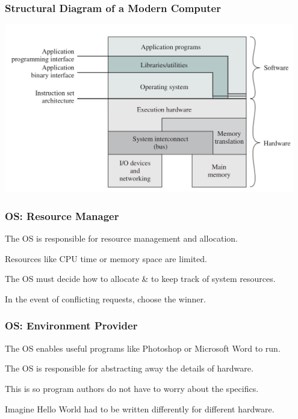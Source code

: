 \begin{frame}
\frametitle{Structural Diagram of a Modern Computer}

\begin{center}
\includegraphics[width=0.95\textwidth]{images/os-sw-hw.png}
\end{center}

\end{frame}


\begin{frame}
\frametitle{OS: Resource Manager}

The OS is responsible for resource management and allocation.

Resources like CPU time or memory space are limited.

The OS must decide how to allocate \& to keep track of system resources.

In the event of conflicting requests, choose the winner.


\end{frame}

\begin{frame}
\frametitle{OS: Environment Provider}

The OS enables useful programs like Photoshop or Microsoft Word to run. 

The OS is responsible for abstracting away the details of hardware.

This is so program authors do not have to worry about the specifics.

Imagine Hello World had to be written differently for different hardware.


\end{frame}

